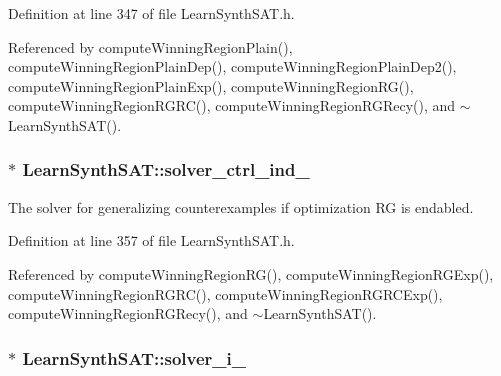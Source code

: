 Definition at line 347 of file Learn\-Synth\-S\-A\-T.\-h.



Referenced by compute\-Winning\-Region\-Plain(), compute\-Winning\-Region\-Plain\-Dep(), compute\-Winning\-Region\-Plain\-Dep2(), compute\-Winning\-Region\-Plain\-Exp(), compute\-Winning\-Region\-R\-G(), compute\-Winning\-Region\-R\-G\-R\-C(), compute\-Winning\-Region\-R\-G\-Recy(), and $\sim$\-Learn\-Synth\-S\-A\-T().

\hypertarget{classLearnSynthSAT_ab81d5f53e078238feb1e948a5a5366ff}{
\subsubsection[{solver\-\_\-ctrl\-\_\-ind\-\_\-}]{$\ast$ Learn\-Synth\-S\-A\-T\-::solver\-\_\-ctrl\-\_\-ind\-\_\-\hspace{0.3cm}{\ttfamily [protected]}}}\label{classLearnSynthSAT_ab81d5f53e078238feb1e948a5a5366ff}


The solver for generalizing counterexamples if optimization R\-G is endabled. 



Definition at line 357 of file Learn\-Synth\-S\-A\-T.\-h.



Referenced by compute\-Winning\-Region\-R\-G(), compute\-Winning\-Region\-R\-G\-Exp(), compute\-Winning\-Region\-R\-G\-R\-C(), compute\-Winning\-Region\-R\-G\-R\-C\-Exp(), compute\-Winning\-Region\-R\-G\-Recy(), and $\sim$\-Learn\-Synth\-S\-A\-T().

\hypertarget{classLearnSynthSAT_a97e5c03d47cb7f237104472972b12c1c}{
\subsubsection[{solver\-\_\-i\-\_\-}]{$\ast$ Learn\-Synth\-S\-A\-T\-::solver\-\_\-i\-\_\-\hspace{0.3cm}{\ttfamily [protected]}}}\label{classLearnSynthSAT_a97e5c03d47cb7f237104472972b12c1c}


